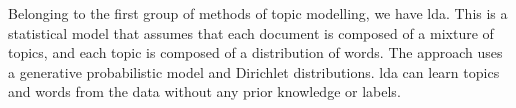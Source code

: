 Belonging to the first group of methods of topic modelling, we have \acrfull{lda}.
%
%
%
This is a statistical model that assumes that each document is composed of a mixture of topics, and each topic is composed of a distribution of words.
The approach uses a generative probabilistic model and Dirichlet distributions.
\acrshort{lda} can learn topics and words from the data without any prior knowledge or labels.




